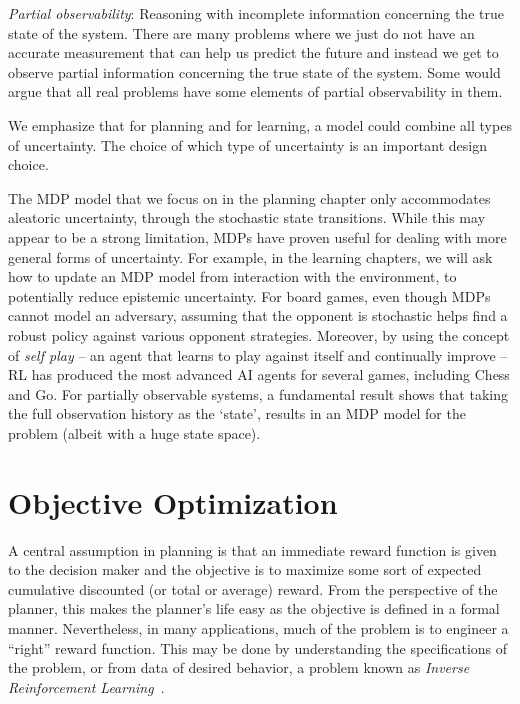     {\em Partial observability}: Reasoning with incomplete information concerning the true state of the system. There are many problems where  we just do not have an accurate measurement that can help us predict the future and instead we get to observe partial information concerning the true state of the system. Some would argue that all real problems have some elements of partial observability in them.


We emphasize that for planning and for learning, a model could combine all types of uncertainty. The choice of which type of uncertainty is an important  design choice.  

The MDP model that we focus on in the planning chapter only accommodates aleatoric uncertainty, through the stochastic state transitions. While this may appear to be a strong limitation, MDPs have proven useful for dealing with more general forms of uncertainty. For example, in the learning chapters, we will ask how to update an MDP model from interaction with the environment, to potentially reduce epistemic uncertainty. For board games, even though MDPs cannot model an adversary, assuming that the opponent is stochastic helps find a robust policy against various opponent strategies. Moreover, by using the concept of \textit{self play} -- an agent that learns to play against itself and continually improve -- RL has produced the most advanced AI agents for several games, including Chess and Go. For partially observable systems, a fundamental result shows that taking the full observation history as the `state', results in an MDP model for the problem (albeit with a huge state space). 




\section{Objective Optimization}

A central assumption in planning is that an immediate reward function is given to the decision maker and the objective is to maximize some sort of expected cumulative discounted (or total or average) reward. 
From the perspective of the planner, this makes the planner's life easy as the objective is defined in a formal manner.
Nevertheless, in many applications, much of the problem is to engineer a ``right'' reward function. This may be done by understanding the specifications of the problem, or from data of desired behavior, a problem known as \textit{Inverse Reinforcement Learning}~\cite{ng2000algorithms}. 


